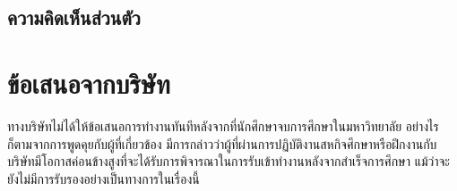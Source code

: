 \subsection{ความคิดเห็นส่วนตัว}

\section{ข้อเสนอจากบริษัท}
ทางบริษัทไม่ได้ให้ข้อเสนอการทำงานทันทีหลังจากที่นักศึกษาจบการศึกษาในมหาวิทยาลัย อย่างไรก็ตามจากการพูดคุยกับผู้ที่เกี่ยวข้อง มีการกล่าวว่าผู้ที่ผ่านการปฏิบัติงานสหกิจศึกษาหรือฝึกงานกับบริษัทมีโอกาสค่อนข้างสูงที่จะได้รับการพิจารณาในการรับเข้าทำงานหลังจากสำเร็จการศึกษา แม้ว่าจะยังไม่มีการรับรองอย่างเป็นทางการในเรื่องนี้

